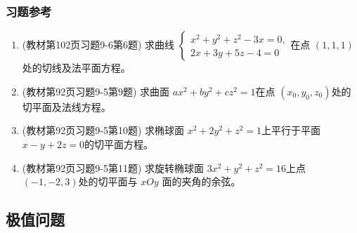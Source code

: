 \subsubsection{习题参考}
\begin{enumerate}
    \item (教材第102页习题9-6第6题) 求曲线
    $\begin{cases}
            x^2 + y^2 + z^2 - 3x = 0, \\
            2 x + 3y + 5z - 4 = 0
        \end{cases}
    $在点 $(1,1,1)$处的切线及法平面方程。

    \item (教材第92页习题9-5第9题) 求曲面 $a x^2 + b y^2 + c z^2 = 1$在点 $(x_0, y_0, z_0)$处的切平面及法线方程。

    \item (教材第92页习题9-5第10题) 求椭球面 $x^2 + 2 y^2 + z^2 =1$上平行于平面 $x-y+2z=0$的切平面方程。

    \item (教材第92页习题9-5第11题) 求旋转椭球面 $3x^2 + y^2  + z^2 =16 $上点 $(-1, -2 , 3)$处的切平面与 $ xOy $ 面的夹角的余弦。
\end{enumerate}

\subsection{极值问题}
